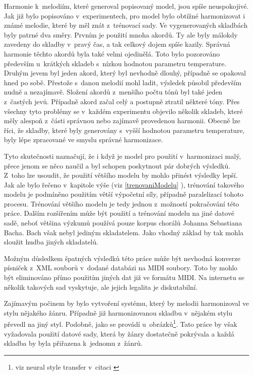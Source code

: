 Harmonie k~melodiím, které generoval popisovaný model,
jsou spíše neuspokojivé.
Jak již bylo popisováno v~experimentech, 
pro model bylo obtížné harmonizovat i známé melodie, 
které by měl znát z~trénovací sady. 
Ve vygenerovaných skladbách  byly patrné dva směry.
Prvním je použití mnoha akordů.
Ty ale byly málokdy zavedeny do skladby v~pravý čas, 
a tak celkový dojem spíše kazily.
Správná harmonie těchto akordů byla také velmi ojedinělá.
Toto bylo pozorováno především u~krátkých skladeb 
s~nízkou hodnotou parametru temperature.
Druhým jevem byl jeden akord, 
který byl nevhodně dlouhý,
případně se opakoval hned po sobě.
Přestože s~danou melodií mohl ladit,
výsledek působil především nudně a nezajímavě.
Složení akordů z~menšího počtu tónů byl také jeden z~častých jevů.
Případně akord začal celý a postupně ztratil některé tóny.
Přes všechny tyto problémy se v~každém experimentu objevilo několik skladeb,
které měly alespoň z~části správnou nebo zajímavě provedenou harmonii.
Obecně lze říci, že skladby, 
které byly generovány s~vyšší hodnotou parametru temperature,
byly lépe zpracované ve smyslu správné harmonizace.
\par
Tyto skutečnosti naznačují, že i když je model pro použití v~harmonizaci malý,
přece jenom se něco naučil a byl schopen poskytnout pár dobrých výsledků.
Z~toho lze usoudit, že použití většího modelu by mohlo přinést výsledky lepší.
Jak ale bylo řečeno v~kapitole výše (viz \ref{trenovaniModelu} ),
trénování takového modelu je podmíněno použitím větší výpočetní síly,
případně paralelizací tohoto procesu.
Trénování většího modelu je tedy jednou z~možností pokračování této práce.
Dalším rozšířením může být použití a trénování modelu na jiné datové sadě,
neboť většina výzkumů používá pouze korpus chorálů Johanna Sebastiana Bacha.
Bach však nebyl jediným skladatelem.
Jako vhodný základ by tak mohla sloužit hudba jiných skladatelů.
\par
Možným důsledkem špatných výsledků této práce
může být nevhodná konverze písniček z~XML souborů v~dodané databázi na MIDI soubory.
Toto by mohlo být eliminováno přímo použitím jiných dat již ve formátu MIDI.
Na internetu se několik takových sad vyskytuje, 
ale jejich legalita je diskutabilní.
\par
Zajímavým počinem by bylo vytvoření systému, který 
by melodii harmonizoval ve stylu nějakého žánru.
Případně již harmonizovanou skladbu v~nějakém stylu 
převedl na jiný styl.
Podobně, jako se provádí u~obrázků\footnote{viz neural style transfer v~citaci \cite{gatys2015neural}}.
Tato práce by však vyžadovala použití datové sady, 
která by žánry dostatečně pokrývala
a každá skladba by byla přiřazena k~jednomu z~žánrů.

